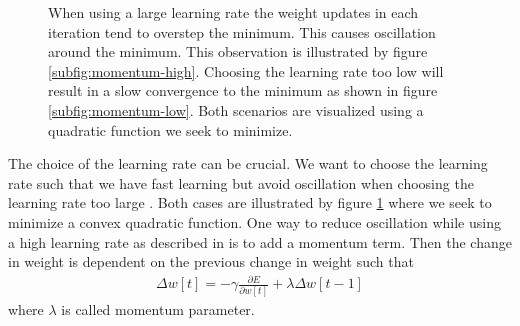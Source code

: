 \begin{figure}[t!]
	\centering
    	\caption[The learning rate and its influence on the rate of convergence.]{When using a large learning rate the weight updates in each iteration tend to overstep the minimum. This causes oscillation around the minimum. This observation is illustrated by figure \ref{subfig:momentum-high}. Choosing the learning rate too low will result in a slow convergence to the minimum as shown in figure \ref{subfig:momentum-low}. Both scenarios are visualized using a quadratic function we seek to minimize.}
    	\label{fig:momentum}
\end{figure}
The choice of the learning rate can be crucial. We want to choose the learning rate such that we have fast learning but avoid oscillation when choosing the learning rate too large \cite[p.~267-268]{Bishop:1995}. Both cases are illustrated by figure \ref{fig:momentum} where we seek to minimize a convex quadratic function. One way to reduce oscillation while using a high learning rate as described in \cite[p.~267-268]{Bishop:1995} is to add a momentum term. Then the change in weight is dependent on the previous change in weight such that
\begin{align}
\Delta w[t] = - \gamma \frac{\partial E}{\partial w[t]} + \lambda \Delta w[t - 1]
\end{align}
where $\lambda$ is called momentum parameter. %


